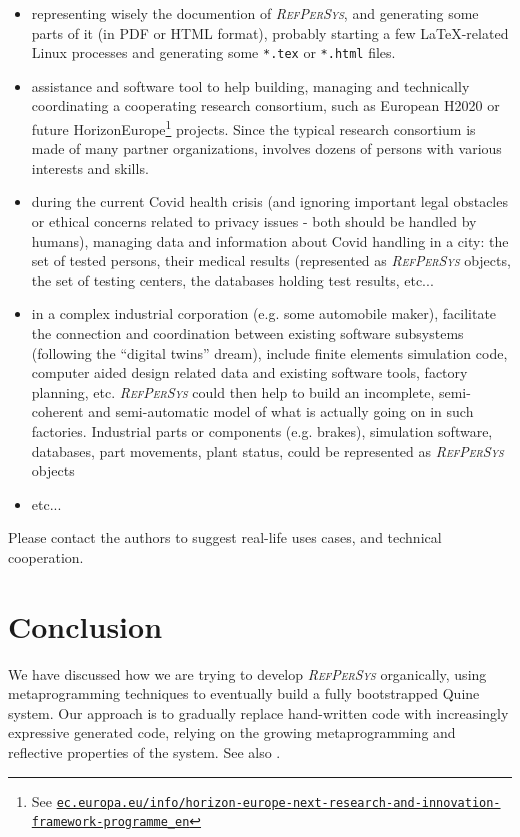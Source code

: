 \documentclass{IEEEtran}
\newcommand{\RefPerSys}{{\textit{\textsc{RefPerSys}}}}
\begin{document}
\begin{itemize}
\item representing wisely the documention of \RefPerSys, and
  generating some parts of it (in PDF or HTML format), probably
  starting a few \LaTeX-related Linux processes and generating some
  \texttt{*.tex} or \texttt{*.html} files.
  
  \item assistance and software tool to help building, managing and
    technically coordinating a cooperating research consortium, such
    as European H2020 or future HorizonEurope\footnote{See
      \href{https://ec.europa.eu/info/horizon-europe-next-research-and-innovation-framework-programme_en}{\texttt{ec.europa.eu/info/horizon-europe-next-research-and-innovation-framework-programme\_en}}}
    projects. Since the typical research consortium is made of many
    partner organizations, involves dozens of persons with various
    interests and skills.

\item during the current Covid health crisis (and ignoring important
  legal obstacles or ethical concerns related to privacy issues - both
  should be handled by humans), managing data and information about
  Covid handling in a city: the set of tested persons, their medical
  results (represented as {\RefPerSys} objects, the set of testing
  centers, the databases holding test results, etc...

\item in a complex industrial corporation (e.g. some automobile
  maker), facilitate the connection and coordination between existing
  software subsystems (following the ``digital twins'' dream), include
  finite elements simulation code, computer aided design related data
  and existing software tools, factory planning, etc.  {\RefPerSys}
  could then help to build an incomplete, semi-coherent and
  semi-automatic model of what is actually going on in such
  factories. Industrial parts or components (e.g. brakes), simulation
  software, databases, part movements, plant status, could be
  represented as {\RefPerSys} objects

\item etc...
  
\end{itemize}

Please contact the authors to suggest real-life uses cases, and
technical cooperation.


\section{Conclusion}
We have discussed how we are trying to develop {\RefPerSys} organically,
using metaprogramming techniques to eventually build a fully bootstrapped
Quine system. Our approach is to gradually replace hand-written code with
increasingly expressive generated code, relying on the growing metaprogramming
and reflective properties of the system. See also \cite{starynkevitch:2019:refpersys-design}.
\end{document}
